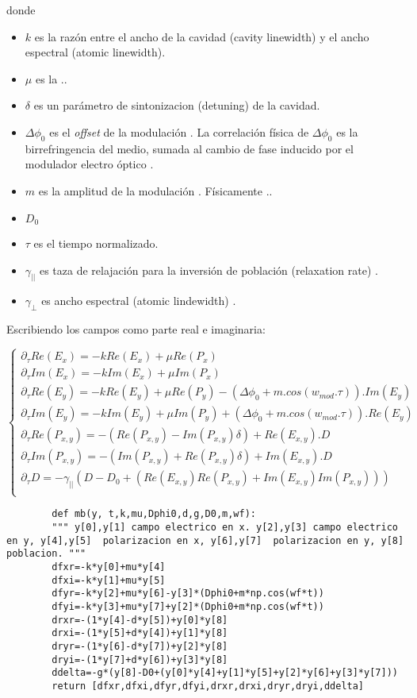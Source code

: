 %		
%		
		donde 
		\begin{itemize}
			\item $k$ es la razón entre el ancho de la cavidad (cavity linewidth) y el ancho espectral (atomic linewidth).
			\item $\mu$ es la ..
			\item $\delta $  es un parámetro de sintonizacion (detuning) de la cavidad.
			\item $\Delta \phi_0 $ es el  \textit{offset} de la modulación . La correlación física de $\Delta \phi_0 $ es la birrefringencia del medio, sumada al cambio de fase inducido por el modulador electro óptico .
			\item $m$ es la amplitud de la modulación . Físicamente ..
			\item $D_0$ 
			\item $\tau$ es el tiempo normalizado.
			\item $\gamma_{||}$ es taza de relajación para la inversión de población (relaxation rate) .
			\item $\gamma_{\bot}$ es ancho espectral (atomic lindewidth) .
		\end{itemize}
		
		
		Escribiendo los campos como parte real e imaginaria:
		
		\[
		\begin{cases}
		\partial_{\tau} Re(E_x)=-k Re(E_x) + \mu Re(P_x) \\
		\partial_{\tau} Im(E_x)=-k Im(E_x) + \mu Im(P_x) \\
		\partial_{\tau} Re(E_y)=-k Re(E_y) + \mu Re(P_y) -(\Delta \phi_0 + m.cos(w_{mod}.\tau)).Im(E_y) \\
		\partial_{\tau} Im(E_y)=-k Im(E_y) + \mu Im(P_y) + (\Delta \phi_0 + m.cos(w_{mod}.\tau)).Re(E_y) \\
		\partial_{\tau} Re(P_{x,y})=-(Re(P_{x,y})-Im(P_{x,y})\delta)+Re(E_{x,y}).D \\
		\partial_{\tau} Im(P_{x,y})=-(Im(P_{x,y})+Re(P_{x,y})\delta)+Im(E_{x,y}).D \\
		\partial_{\tau} D=-\gamma_{||}(D-D_0+(Re(E_{x,y})Re(P_{x,y})+Im(E_{x,y})Im(P_{x,y}))) \\
		\end{cases}
		\]
		
		\begin{lstlisting}
		def mb(y, t,k,mu,Dphi0,d,g,D0,m,wf):
		""" y[0],y[1] campo electrico en x. y[2],y[3] campo electrico en y, y[4],y[5]  polarizacion en x, y[6],y[7]  polarizacion en y, y[8] poblacion. """
		dfxr=-k*y[0]+mu*y[4]
		dfxi=-k*y[1]+mu*y[5]
		dfyr=-k*y[2]+mu*y[6]-y[3]*(Dphi0+m*np.cos(wf*t))
		dfyi=-k*y[3]+mu*y[7]+y[2]*(Dphi0+m*np.cos(wf*t))
		drxr=-(1*y[4]-d*y[5])+y[0]*y[8]
		drxi=-(1*y[5]+d*y[4])+y[1]*y[8]
		dryr=-(1*y[6]-d*y[7])+y[2]*y[8]
		dryi=-(1*y[7]+d*y[6])+y[3]*y[8]
		ddelta=-g*(y[8]-D0+(y[0]*y[4]+y[1]*y[5]+y[2]*y[6]+y[3]*y[7]))
		return [dfxr,dfxi,dfyr,dfyi,drxr,drxi,dryr,dryi,ddelta]
		\end{lstlisting}
		
